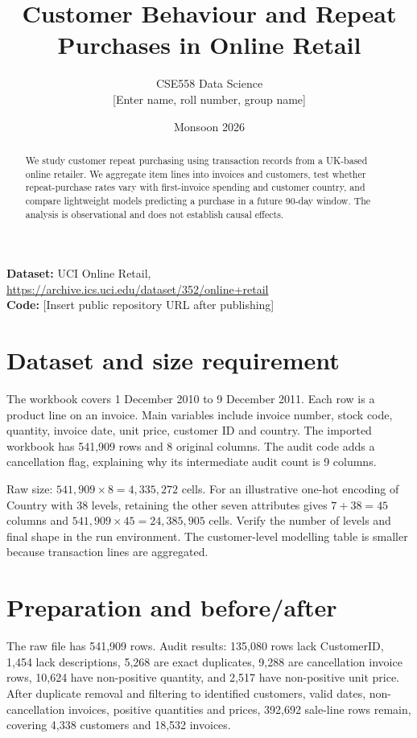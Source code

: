 \documentclass[10pt,a4paper,twocolumn]{article}
\title{Customer Behaviour and Repeat Purchases in Online Retail}
\author{CSE558 Data Science\\[2pt]\small [Enter name, roll number, group name]}
\date{Monsoon 2026}
\begin{document}
\maketitle
\textbf{Dataset:} UCI Online Retail, \url{https://archive.ics.uci.edu/dataset/352/online+retail}\\
\textbf{Code:} [Insert public repository URL after publishing]

\begin{abstract}
We study customer repeat purchasing using transaction records from a UK-based online retailer. We aggregate item lines into invoices and customers, test whether repeat-purchase rates vary with first-invoice spending and customer country, and compare lightweight models predicting a purchase in a future 90-day window. The analysis is observational and does not establish causal effects.
\end{abstract}

\section{Dataset and size requirement}
The workbook covers 1 December 2010 to 9 December 2011. Each row is a product line on an invoice. Main variables include invoice number, stock code, quantity, invoice date, unit price, customer ID and country. The imported workbook has 541,909 rows and 8 original columns. The audit code adds a cancellation flag, explaining why its intermediate audit count is 9 columns.

Raw size: \(541{,}909\times8=4{,}335{,}272\) cells. For an illustrative one-hot encoding of Country with 38 levels, retaining the other seven attributes gives \(7+38=45\) columns and \(541{,}909\times45=24{,}385{,}905\) cells. Verify the number of levels and final shape in the run environment. The customer-level modelling table is smaller because transaction lines are aggregated.

\section{Preparation and before/after}
The raw file has 541,909 rows. Audit results: 135,080 rows lack CustomerID, 1,454 lack descriptions, 5,268 are exact duplicates, 9,288 are cancellation invoice rows, 10,624 have non-positive quantity, and 2,517 have non-positive unit price. After duplicate removal and filtering to identified customers, valid dates, non-cancellation invoices, positive quantities and prices, 392,692 sale-line rows remain, covering 4,338 customers and 18,532 invoices.
\end{document}
